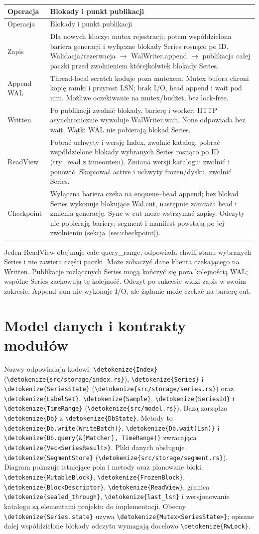 \documentclass[11pt,a4paper]{article}
\newcommand{\code}[1]{\expandafter\nolinkurl\expandafter{\detokenize{#1}}}
\newcommand{\tabhead}[1]{\toprule #1\\ \midrule\endfirsthead
  \toprule #1\\ \midrule\endhead \bottomrule\endfoot}
\begin{document}
\begin{longtable}{P{25mm}P{131mm}}
\tabhead{Operacja & Blokady i punkt publikacji}
Zapis & Dla nowych kluczy: mutex rejestracji; potem współdzielona
bariera generacji i wyłączne blokady Series rosnąco po ID.
Walidacja/rezerwacja $\rightarrow$ WalWriter.append $\rightarrow$
publikacja całej paczki przed zwolnieniem którejkolwiek blokady Series.\\
Append WAL & Thread-local scratch koduje poza mutexem.
Mutex bufora chroni kopię ramki i przyrost LSN; brak I/O, head append
i wait pod nim. Możliwe oczekiwanie na mutex/budżet, bez lock-free.\\
Written & Po publikacji zwolnić blokady, barierę i worker;
HTTP asynchronicznie wywołuje WalWriter.wait. None odpowiada bez wait.
Wątki WAL nie pobierają blokad Series.\\
ReadView & Pobrać uchwyty i wersję Index, zwolnić katalog,
pobrać współdzielone blokady wybranych Series rosnąco po ID
(try\_read z timeoutem). Zmiana wersji katalogu: zwolnić i ponowić.
Skopiować active i uchwyty frozen/dysku, zwolnić Series.\\
Checkpoint & Wyłączna bariera czeka na enqueue--head append;
bez blokad Series wykonuje blokujące Wal.cut, następnie zamraża head
i zmienia generację. Sync w cut może wstrzymać zapisy.
Odczyty nie pobierają bariery; segment i manifest powstają po jej
zwolnieniu (sekcja~\ref{sec:checkpoint}).\\
\end{longtable}

Jeden ReadView obejmuje całe query\_range, odpowiada chwili stanu
wybranych Series i nie zawiera części paczki. Może zobaczyć dane klienta
czekającego na Written. Publikacje rozłącznych Series mogą kończyć się
poza kolejnością WAL; wspólne Series zachowują tę kolejność.
Odczyt po sukcesie widzi zapis w swoim zakresie.
Append sam nie wykonuje I/O, ale żądanie może czekać na barierę cut.

\section{Model danych i kontrakty modułów}
\label{sec:model}

Nazwy odpowiadają kodowi: \code{Index} (\code{src/storage/index.rs}),
\code{Series} i \code{SeriesState} (\code{src/storage/series.rs})
oraz \code{LabelSet}, \code{Sample}, \code{SeriesId} i \code{TimeRange}
(\code{src/model.rs}). Bazą zarządza \code{Db} z \code{DbState}.
Metody to \code{Db.write(WriteBatch)}, \code{Db.wait(Lsn)}
i \code{Db.query(&[Matcher], TimeRange)} zwracająca \code{Vec<SeriesResult>}.
Pliki danych obsługuje \code{SegmentStore} (\code{src/storage/segment.rs}).
Diagram pokazuje istniejące pola i metody oraz planowane bloki.
\code{MutableBlock}, \code{FrozenBlock}, \code{BlockDescriptor},
\code{ReadView}, granica \code{sealed_through}, \code{last_lsn}
i wersjonowanie katalogu są elementami projektu do implementacji.
Obecny \code{Series.state} używa \code{Mutex<SeriesState>}; opisane dalej
współdzielone blokady odczytu wymagają docelowo \code{RwLock}.
\end{document}
